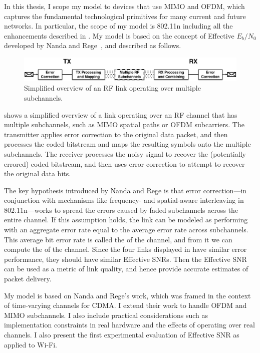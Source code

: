 In this thesis, I scope my model to devices that use MIMO and OFDM, which captures the fundamental technological primitives for many current and future networks. In particular, the scope of my model is 802.11n including all the enhancements described in . My model is based on the concept of Effective $E_b/N_0$ developed by Nanda and Rege~\cite{Nanda_EffectiveSNR}, and described as follows.
 
\begin{figure}[t!]
	\centering
	\includegraphics[width=\textwidth]{figures/approach/esnr_intuitive.pdf}
	\caption[Simplified overview of an RF link operating over multiple subchannels]{\label{fig:esnr_intuitive}Simplified overview of an RF link operating over multiple subchannels.}
\end{figure}

 shows a simplified overview of a link operating over an RF channel that has multiple subchannels, such as MIMO spatial paths or OFDM subcarriers. The transmitter applies error correction to the original data packet, and then processes the coded bitstream and maps the resulting symbols onto the multiple subchannels. The receiver processes the noisy signal to recover the (potentially errored) coded bitstream, and then uses error correction to attempt to recover the original data bits.

The key hypothesis introduced by Nanda and Rege is that error correction---in conjunction with mechanisms like frequency- and spatial-aware interleaving in 802.11n---works to spread the errors caused by faded subchannels across the entire channel. If this assumption holds, the link can be modeled as performing with an aggregate error rate equal to the average error rate across subchannels. This average bit error rate is called the  of the channel, and from it we can compute the  of the channel. Since the four links displayed in  have similar error performance, they should have similar Effective SNRs. Then the Effective SNR can be used as a metric of link quality, and hence provide accurate estimates of packet delivery.

My model is based on Nanda and Rege's work, which was framed in the context of time-varying channels for CDMA. I extend their work to handle OFDM and MIMO subchannels. I also include practical considerations such as implementation constraints in real hardware and the effects of operating over real channels. I also present the first experimental evaluation of Effective SNR as applied to Wi-Fi.

